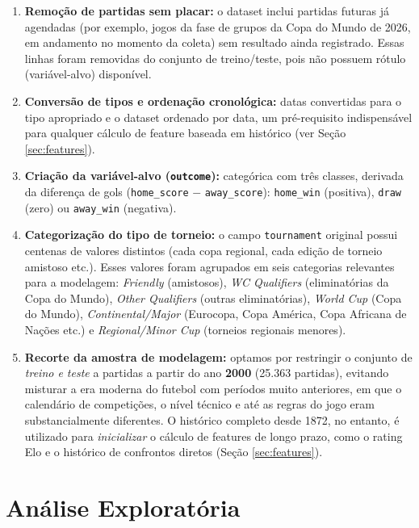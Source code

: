 \documentclass[12pt,a4paper]{article}
\begin{document}
\begin{enumerate}
    \item \textbf{Remoção de partidas sem placar:} o dataset inclui partidas futuras já agendadas (por exemplo, jogos da fase de grupos da Copa do Mundo de 2026, em andamento no momento da coleta) sem resultado ainda registrado. Essas linhas foram removidas do conjunto de treino/teste, pois não possuem rótulo (variável-alvo) disponível.
    \item \textbf{Conversão de tipos e ordenação cronológica:} datas convertidas para o tipo apropriado e o dataset ordenado por data, um pré-requisito indispensável para qualquer cálculo de feature baseada em histórico (ver Seção \ref{sec:features}).
    \item \textbf{Criação da variável-alvo (\texttt{outcome}):} categórica com três classes, derivada da diferença de gols (\texttt{home\_score} $-$ \texttt{away\_score}): \texttt{home\_win} (positiva), \texttt{draw} (zero) ou \texttt{away\_win} (negativa).
    \item \textbf{Categorização do tipo de torneio:} o campo \texttt{tournament} original possui centenas de valores distintos (cada copa regional, cada edição de torneio amistoso etc.). Esses valores foram agrupados em seis categorias relevantes para a modelagem: \emph{Friendly} (amistosos), \emph{WC Qualifiers} (eliminatórias da Copa do Mundo), \emph{Other Qualifiers} (outras eliminatórias), \emph{World Cup} (Copa do Mundo), \emph{Continental/Major} (Eurocopa, Copa América, Copa Africana de Nações etc.) e \emph{Regional/Minor Cup} (torneios regionais menores).
    \item \textbf{Recorte da amostra de modelagem:} optamos por restringir o conjunto de \emph{treino e teste} a partidas a partir do ano \textbf{2000} (25.363 partidas), evitando misturar a era moderna do futebol com períodos muito anteriores, em que o calendário de competições, o nível técnico e até as regras do jogo eram substancialmente diferentes. O histórico completo desde 1872, no entanto, é utilizado para \emph{inicializar} o cálculo de features de longo prazo, como o rating Elo e o histórico de confrontos diretos (Seção \ref{sec:features}).
\end{enumerate}

\section{Análise Exploratória}
\label{sec:eda}
\end{document}
